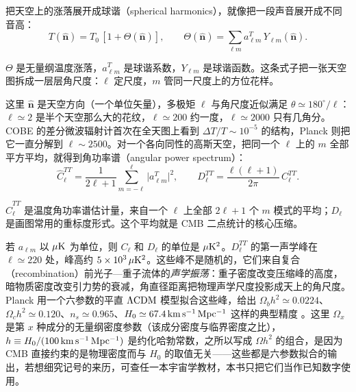 把天空上的涨落展开成球谐（spherical harmonics），就像把一段声音展开成不同音高：
\begin{equation}
  T(\hat{\bm n})=T_0\,[1+\Theta(\hat{\bm n})],
  \qquad
  \Theta(\hat{\bm n})=\sum_{\ell m}a^{T}_{\ell m}\,Y_{\ell m}(\hat{\bm n}).
  \label{eq:e23-temperature-expansion}
\end{equation}
\begin{formulaexplain}
\(\Theta\) 是无量纲温度涨落，\(a^{T}_{\ell m}\) 是球谐系数，\(Y_{\ell m}\) 是球谐函数。这条式子把一张天空图拆成一层层角尺度：\(\ell\) 定尺度，\(m\) 管同一尺度上的方位花样。
\end{formulaexplain}
这里 \(\hat{\bm n}\) 是天空方向（一个单位矢量），多极矩 \(\ell\) 与角尺度近似满足 \(\theta\simeq180^\circ/\ell\)：\(\ell\simeq2\) 是半个天空那么大的花纹，\(\ell\simeq200\) 约一度，\(\ell\simeq2000\) 只有几角分。COBE 的差分微波辐射计首次在全天图上看到 \(\Delta T/T\sim10^{-5}\) 的结构，Planck 则把它一直分解到 \(\ell\sim2500\)。对一个各向同性的高斯天空，把同一个 \(\ell\) 上的 \(m\) 全部平方平均，就得到角功率谱（angular power spectrum）：
\begin{equation}
  \widehat C^{TT}_\ell=\frac{1}{2\ell+1}\sum_{m=-\ell}^{\ell}\bigl|a^{T}_{\ell m}\bigr|^2,
  \qquad
  D^{TT}_\ell=\frac{\ell(\ell+1)}{2\pi}\,C^{TT}_\ell .
  \label{eq:e23-cl-estimator}
\end{equation}
\begin{formulaexplain}
\(\widehat C^{TT}_\ell\) 是温度角功率谱估计量，来自一个 \(\ell\) 上全部 \(2\ell+1\) 个 \(m\) 模式的平均；\(D_\ell\) 是画图常用的重标度形式。这个平均就是 CMB 二点统计的核心压缩。
\end{formulaexplain}
若 \(a_{\ell m}\) 以 \(\mu{\rm K}\) 为单位，则 \(C_\ell\) 和 \(D_\ell\) 的单位是 \(\mu{\rm K}^2\)。\(D^{TT}_\ell\) 的第一声学峰在 \(\ell\simeq220\) 处，峰高约 \(5\times10^3\,\mu{\rm K}^2\)。这些峰不是随机的，它们来自复合（recombination）前光子—重子流体的\emph{声学振荡}：重子密度改变压缩峰的高度，暗物质密度改变引力势的衰减，角直径距离把物理声学尺度投影成天上的角尺度。Planck 用一个六参数的平直 \(\Lambda{\rm CDM}\) 模型拟合这些峰，给出 \(\Omega_bh^2\simeq0.0224\)、\(\Omega_ch^2\simeq0.120\)、\(n_s\simeq0.965\)、\(H_0\simeq67.4\,{\rm km\,s^{-1}\,Mpc^{-1}}\) 这样的典型精度 \citep{1992ApJ...396L...1S,1996ApJ...469..437S,2020A&A...641A...5P,2020A&A...641A...6P}。这里 \(\Omega_x\) 是第 \(x\) 种成分的无量纲密度参数（该成分密度与临界密度之比），\(h\equiv H_0/(100\,{\rm km\,s^{-1}\,Mpc^{-1}})\) 是约化哈勃常数，之所以写成 \(\Omega h^2\) 的组合，是因为 CMB 直接约束的是物理密度而与 \(H_0\) 的取值无关——这些都是六参数拟合的输出，若想细究记号的来历，可查任一本宇宙学教材，本书只把它们当作已知数字使用。

